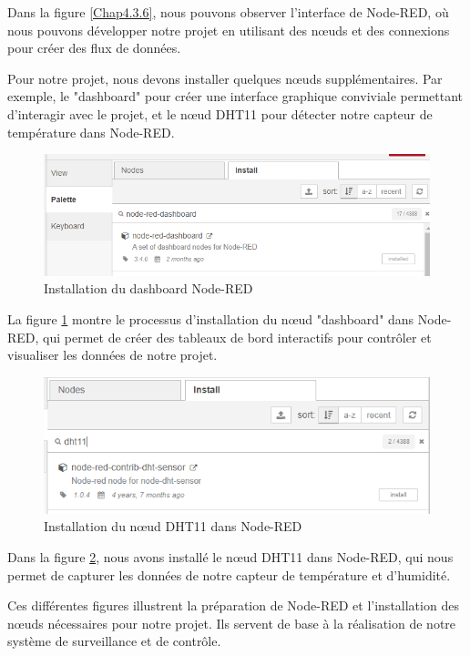 Dans la figure \ref{Chap4.3.6}, nous pouvons observer l'interface de Node-RED, où nous pouvons développer notre projet en utilisant des nœuds et des connexions pour créer des flux de données.

Pour notre projet, nous devons installer quelques nœuds supplémentaires. Par exemple, le "dashboard" pour créer une interface graphique conviviale permettant d'interagir avec le projet, et le nœud DHT11 pour détecter notre capteur de température dans Node-RED.

\begin{figure}[H]
\centering
\includegraphics[width=15cm]{Images/Node-Red-Dashboard-Installed.png}
\caption{Installation du dashboard Node-RED}
\label{Chap4.3.7}
\end{figure}

La figure \ref{Chap4.3.7} montre le processus d'installation du nœud "dashboard" dans Node-RED, qui permet de créer des tableaux de bord interactifs pour contrôler et visualiser les données de notre projet.

\begin{figure}[H]
\centering
\includegraphics[width=15cm]{Images/DHT11-Node-Red-Install.png}
\caption{Installation du nœud DHT11 dans Node-RED}
\label{Chap4.3.8}
\end{figure}

Dans la figure \ref{Chap4.3.8}, nous avons installé le nœud DHT11 dans Node-RED, qui nous permet de capturer les données de notre capteur de température et d'humidité.

Ces différentes figures illustrent la préparation de Node-RED et l'installation des nœuds nécessaires pour notre projet. Ils servent de base à la réalisation de notre système de surveillance et de contrôle.


